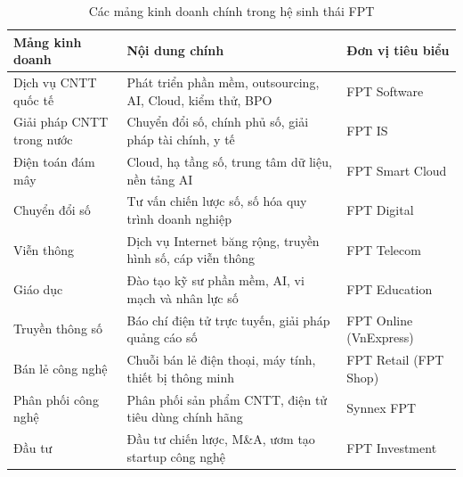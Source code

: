 \begin{table}[htbp]
\centering
\small
\caption{Các mảng kinh doanh chính trong hệ sinh thái FPT}
\label{tab:mang_kinh_doanh}
\begin{tabularx}{\textwidth}{p{3.8cm} X p{3.2cm}}
\toprule
\textbf{Mảng kinh doanh} & \textbf{Nội dung chính} & \textbf{Đơn vị tiêu biểu} \\
\midrule
Dịch vụ CNTT quốc tế & Phát triển phần mềm, outsourcing, AI, Cloud, kiểm thử, BPO & FPT Software \\
Giải pháp CNTT trong nước & Chuyển đổi số, chính phủ số, giải pháp tài chính, y tế & FPT IS \\
Điện toán đám mây & Cloud, hạ tầng số, trung tâm dữ liệu, nền tảng AI & FPT Smart Cloud \\
Chuyển đổi số & Tư vấn chiến lược số, số hóa quy trình doanh nghiệp & FPT Digital \\
Viễn thông & Dịch vụ Internet băng rộng, truyền hình số, cáp viễn thông & FPT Telecom \\
Giáo dục & Đào tạo kỹ sư phần mềm, AI, vi mạch và nhân lực số & FPT Education \\
Truyền thông số & Báo chí điện tử trực tuyến, giải pháp quảng cáo số & FPT Online (VnExpress) \\
Bán lẻ công nghệ & Chuỗi bán lẻ điện thoại, máy tính, thiết bị thông minh & FPT Retail (FPT Shop) \\
Phân phối công nghệ & Phân phối sản phẩm CNTT, điện tử tiêu dùng chính hãng & Synnex FPT \\
Đầu tư & Đầu tư chiến lược, M\&A, ươm tạo startup công nghệ & FPT Investment \\
\bottomrule
\end{tabularx}
\end{table}

